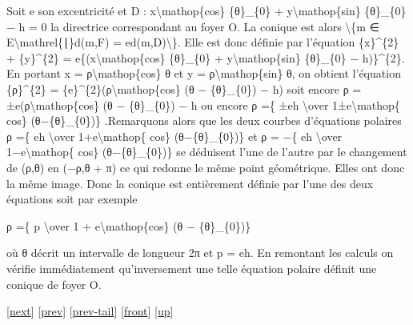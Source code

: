 \documentclass[]{article}
\begin{document}
Soit e son excentricité et D : x\textbackslash{}mathop\{cos\}
\{θ\}\_\{0\} + y\textbackslash{}mathop\{sin\} \{θ\}\_\{0\} − h = 0 la
directrice correspondant au foyer O. La conique est alors
\textbackslash{}\{m ∈ E\textbackslash{}mathrel\{∣\}d(m,F) =
ed(m,D)\textbackslash{}\}. Elle est donc définie par l'équation
\{x\}\^{}\{2\} + \{y\}\^{}\{2\} = e\{(x\textbackslash{}mathop\{cos\}
\{θ\}\_\{0\} + y\textbackslash{}mathop\{sin\} \{θ\}\_\{0\} −
h)\}\^{}\{2\}. En portant x = ρ\textbackslash{}mathop\{cos\} θ et y =
ρ\textbackslash{}mathop\{sin\} θ, on obtient l'équation \{ρ\}\^{}\{2\} =
\{e\}\^{}\{2\}(ρ\textbackslash{}mathop\{cos\} (θ − \{θ\}\_\{0\}) − h)
soit encore ρ = ±e(ρ\textbackslash{}mathop\{cos\} (θ − \{θ\}\_\{0\}) − h
ou encore ρ =\{ ±eh \textbackslash{}over 1±e\textbackslash{}mathop\{
cos\} (θ−\{θ\}\_\{0\})\} .Remarquons alors que les deux courbes
d'équations polaires ρ =\{ eh \textbackslash{}over
1+e\textbackslash{}mathop\{ cos\} (θ−\{θ\}\_\{0\})\} et ρ = −\{ eh
\textbackslash{}over 1−e\textbackslash{}mathop\{ cos\}
(θ−\{θ\}\_\{0\})\} se déduisent l'une de l'autre par le changement de
(ρ,θ) en (−ρ,θ + π) ce qui redonne le même point géométrique. Elles ont
donc la même image. Donc la conique est entièrement définie par l'une
des deux équations soit par exemple

ρ =\{ p \textbackslash{}over 1 + e\textbackslash{}mathop\{cos\} (θ −
\{θ\}\_\{0\})\}

où θ décrit un intervalle de longueur 2π et p = eh. En remontant les
calculs on vérifie immédiatement qu'inversement une telle équation
polaire définit une conique de foyer O.

{[}\href{coursse98.html}{next}{]} {[}\href{coursse96.html}{prev}{]}
{[}\href{coursse96.html\#tailcoursse96.html}{prev-tail}{]}
{[}\href{coursse97.html}{front}{]}
{[}\href{coursch19.html\#coursse97.html}{up}{]}
\end{document}

